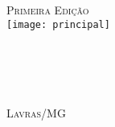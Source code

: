 \cleardoublepage
\newpage
\thispagestyle{empty}

\begin{titlepage}
\begin{center}
\textsc{\LARGE Primeira Edição}\\[0.25cm]
\texttt{[image: principal]}\\[0.25cm]
\HRule{0.4cm} \\[0.4cm]
{ \huge \bfseries \mytitle}\\[0.4cm]
\HRule{0.4cm} \\[0.7cm]
{\LARGE \textsc{\mysubtitle}}\\[0.5cm]
\vfill
\textsc{\Large  \myauthor }
\begin{comment}
\begin{minipage}{0.4\textwidth}
\begin{flushleft} \large
\myauthor %
\end{flushleft}
\end{minipage}
\begin{minipage}{0.4\textwidth}
\begin{flushright} \large
\emph{email:} \\
\ImprimirEmail
\end{flushright}
\end{minipage}
\end{comment}
\vfill
\textsc{\Large Lavras/MG}\\[0.4cm]
\textsc{\Large \imprimiryear}
\end{center}
\end{titlepage}
